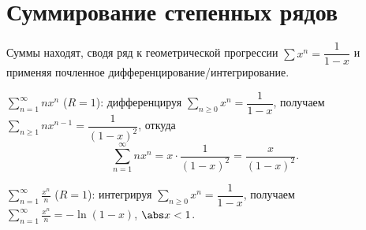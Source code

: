\section{Суммирование степенных рядов}

Суммы находят, сводя ряд к геометрической прогрессии $\sum x^n=\dfrac1{1-x}$ и применяя почленное
дифференцирование/интегрирование.

\begin{example}
$\displaystyle\sum_{n=1}^\infty n x^n$ ($R=1$): дифференцируя $\sum_{n\ge0}x^n=\dfrac1{1-x}$,
получаем $\sum_{n\ge1}n x^{n-1}=\dfrac1{(1-x)^2}$, откуда
\[
  \sum_{n=1}^\infty n x^n=x\cdot\frac{1}{(1-x)^2}=\frac{x}{(1-x)^2}.
\]
\end{example}

\begin{example}
$\displaystyle\sum_{n=1}^\infty\frac{x^n}{n}$ ($R=1$): интегрируя $\sum_{n\ge0}x^n=\dfrac1{1-x}$,
получаем $\displaystyle\sum_{n=1}^\infty\frac{x^n}{n}=-\ln(1-x)$, $\abs x<1$.
\end{example}
